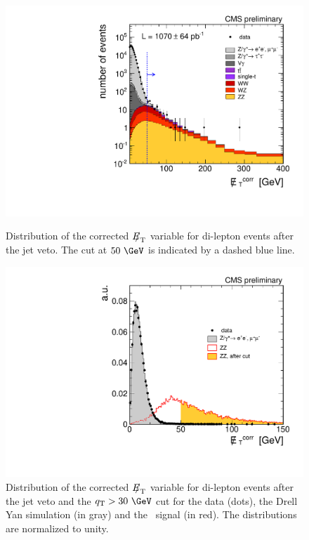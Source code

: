 \begin{figure}[bt]
\begin{minipage}[t]{0.48\linewidth}
\centering
\includegraphics[width=1\linewidth]{figures/ZZ_2l2n/corrMET_jet.pdf}
\caption{Distribution of the corrected ${E\!\!\!/}_{\mathrm{T}}$ variable for di-lepton events after the jet veto. The cut at $50~\GeV$ is indicated by a dashed blue line. \label{fig:ZZ_2l2n_corrMET_jet}}
\end{minipage}
\hspace{0.5cm}
\begin{minipage}[t]{0.48\linewidth}
\centering
\includegraphics[width=1\linewidth]{figures/ZZ_2l2n/corrMET_q30_jet.pdf}
\caption{Distribution of the corrected ${E\!\!\!/}_{\mathrm{T}}$ variable for di-lepton events after the jet veto and the $\QT>30~\GeV$ cut for the data (dots), the Drell Yan simulation (in gray) and the \ZZ\ signal (in red). The distributions are normalized to unity.  \label{fig:ZZ_2l2n_corrMET_q30_jet}}
\end{minipage}
\end{figure}

